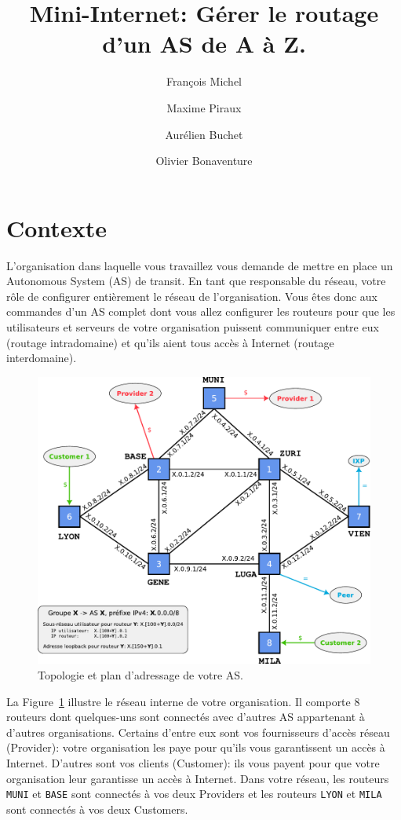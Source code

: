 \documentclass[a4paper, 11pt]{article}
\title{Mini-Internet: Gérer le routage d'un AS de A à Z.}
\author{François Michel \and Maxime Piraux \and Aurélien Buchet \and Olivier 
Bonaventure}
\begin{document}
\maketitle
\tableofcontents

\section{Contexte}

L'organisation dans laquelle vous travaillez vous demande
de mettre en place un Autonomous System (AS) de transit.
En tant que responsable du réseau, votre rôle
de configurer entièrement le réseau de l'organisation.
Vous êtes donc aux commandes d'un AS complet
dont vous allez configurer les routeurs pour que les utilisateurs
et serveurs de votre organisation puissent communiquer entre eux
(routage intradomaine) et qu'ils aient tous accès à Internet
(routage interdomaine).

\begin{figure}
    \includegraphics[width=\linewidth]{figures/topo}
    \caption{Topologie et plan d'adressage de votre AS.}
    \label{fig:topo}
\end{figure}

La Figure~\ref{fig:topo} illustre le réseau interne de votre organisation.
Il comporte 8 routeurs dont quelques-uns sont connectés avec d'autres AS
appartenant à d'autres organisations. Certains d'entre eux sont
vos fournisseurs d'accès réseau (Provider): votre organisation
les paye pour qu'ils vous garantissent un accès à Internet.
D'autres sont vos clients (Customer): ils vous payent pour que
votre organisation leur garantisse un accès à Internet.   
Dans votre réseau, les routeurs \texttt{MUNI} et \texttt{BASE}
sont connectés à vos deux Providers et les routeurs \texttt{LYON}
et \texttt{MILA} sont connectés à vos deux Customers.
\end{document}
